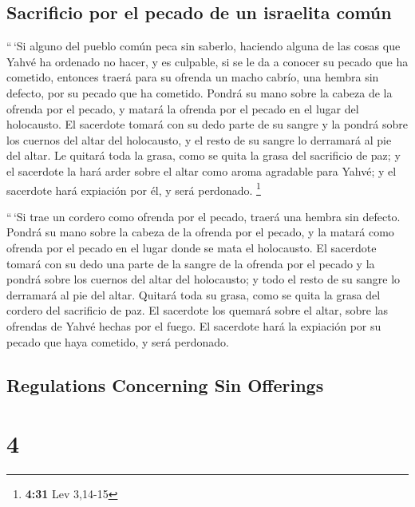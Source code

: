 \begin{paracol}{2}
\hypertarget{sacrificio-por-el-pecado-de-un-israelita-comuxfan}{%
\subsection{Sacrificio por el pecado de un israelita
común}\label{sacrificio-por-el-pecado-de-un-israelita-comuxfan}}

 ``\,`Si alguno del pueblo común peca sin saberlo,
haciendo alguna de las cosas que Yahvé ha ordenado no hacer, y es
culpable,  si se le da a conocer su pecado que ha
cometido, entonces traerá para su ofrenda un macho cabrío, una hembra
sin defecto, por su pecado que ha cometido.  Pondrá su
mano sobre la cabeza de la ofrenda por el pecado, y matará la ofrenda
por el pecado en el lugar del holocausto.  El sacerdote
tomará con su dedo parte de su sangre y la pondrá sobre los cuernos del
altar del holocausto, y el resto de su sangre lo derramará al pie del
altar.  Le quitará toda la grasa, como se quita la grasa
del sacrificio de paz; y el sacerdote la hará arder sobre el altar como
aroma agradable para Yahvé; y el sacerdote hará expiación por él, y será
perdonado. \footnote{\textbf{4:31} Lev 3,14-15}

 ``\,`Si trae un cordero como ofrenda por el pecado,
traerá una hembra sin defecto.  Pondrá su mano sobre la
cabeza de la ofrenda por el pecado, y la matará como ofrenda por el
pecado en el lugar donde se mata el holocausto.  El
sacerdote tomará con su dedo una parte de la sangre de la ofrenda por el
pecado y la pondrá sobre los cuernos del altar del holocausto; y todo el
resto de su sangre lo derramará al pie del altar. 
Quitará toda su grasa, como se quita la grasa del cordero del sacrificio
de paz. El sacerdote los quemará sobre el altar, sobre las ofrendas de
Yahvé hechas por el fuego. El sacerdote hará la expiación por su pecado
que haya cometido, y será perdonado.

\switchcolumn
\begin{otherlanguage}{english}

\hypertarget{regulations-concerning-sin-offerings}{%
\subsection{Regulations Concerning Sin
Offerings}\label{regulations-concerning-sin-offerings}}

\hypertarget{section-7}{%
\section{4}\label{section-7}}


\end{otherlanguage}
\end{paracol}
